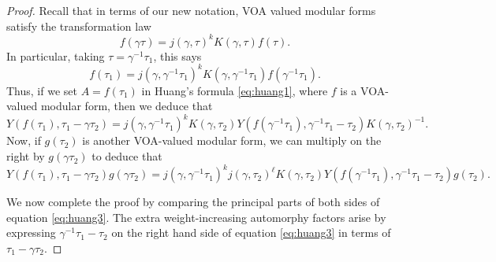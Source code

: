 \documentclass[12pt]{amsart}
\theoremstyle{plain}
\theoremstyle{definition}
\theoremstyle{remark}
\begin{document}
\begin{proof}
    Recall that in terms of our new notation, VOA valued modular forms satisfy the transformation law
    \[
      f(\gamma \tau) = j(\gamma,\tau)^kK(\gamma,\tau)f(\tau).
    \]
    In particular, taking $\tau = \gamma^{-1}\tau_1$, this says
    \[
      f(\tau_1) = j(\gamma,\gamma^{-1}\tau_1)^kK(\gamma,\gamma^{-1}\tau_1)f(\gamma^{-1}\tau_1).
    \]
    Thus, if we set $A = f(\tau_1)$ in Huang's formula \eqref{eq:huang1}, where $f$ is a VOA-valued modular form, then we deduce that
        \begin{equation}
        \label{eq:huang2}
        Y(f(\tau_1),\tau_1-\gamma \tau_2) = j(\gamma,\gamma^{-1}\tau_1)^kK(\gamma, \tau_2)Y(f(\gamma^{-1}\tau_1),\gamma^{-1}\tau_1-\tau_2) K(\gamma,\tau_2)^{-1}.
    \end{equation}
    Now, if $g(\tau_2)$ is another VOA-valued modular form, we can multiply on the right by $g(\gamma \tau_2)$ to deduce that
        \begin{equation}
        \label{eq:huang3}
        Y(f(\tau_1),\tau_1-\gamma \tau_2)g(\gamma \tau_2) = j(\gamma, \gamma^{-1}\tau_1)^kj(\gamma,\tau_2)^{\ell}K(\gamma, \tau_2)Y(f(\gamma^{-1}\tau_1),\gamma^{-1}\tau_1-\tau_2) g(\tau_2).
    \end{equation}

    We now complete the proof by comparing the principal parts of both sides of equation \eqref{eq:huang3}. The extra weight-increasing automorphy factors arise by expressing $\gamma^{-1}\tau_1-\tau_2$ on the right hand side of equation \eqref{eq:huang3} in terms of $\tau_1-\gamma\tau_2$.


\end{proof}
\end{document}
